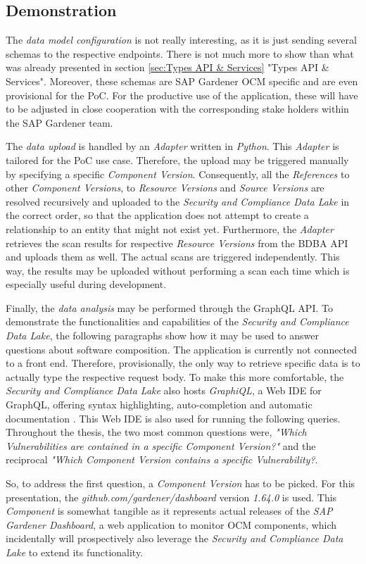 \subsection{Demonstration}
The \emph{data model configuration} is not really interesting, as it is just sending several schemas to the respective endpoints. There is not much more to show than what was already presented in section \ref{sec:Types API & Services} "Types API \& Services". Moreover, these schemas are SAP Gardener OCM specific and are even provisional for the PoC. For the productive use of the application, these will have to be adjusted in close cooperation with the corresponding stake holders within the SAP Gardener team.\par
The \emph{data upload} is handled by an \emph{Adapter} written in \emph{Python}. This \emph{Adapter} is tailored for the PoC use case. Therefore, the upload may be triggered manually by specifying a specific \emph{Component Version}. Consequently, all the \emph{References} to other \emph{Component Versions}, to \emph{Resource Versions} and  \emph{Source Versions} are resolved recursively and uploaded to the \emph{Security and Compliance Data Lake} in the correct order, so that the application does not attempt to create a relationship to an entity that might not exist yet. Furthermore, the \emph{Adapter} retrieves the scan results for respective \emph{Resource Versions} from the BDBA API and uploads them as well. The actual scans are triggered independently. This way, the results may be uploaded without performing a scan each time which is especially useful during development.\par
Finally, the \emph{data analysis} may be performed through the GraphQL API. To demonstrate the functionalities and capabilities of the \emph{Security and Compliance Data Lake}, the following paragraphs show how it may be used to answer questions about software composition. The application is currently not connected to a front end. Therefore, provisionally, the only way to retrieve specific data is to actually type the respective request body. To make this more comfortable, the \emph{Security and Compliance Data Lake} also hosts \emph{GraphiQL}, a Web IDE for GraphQL, offering syntax highlighting, auto-completion and automatic documentation \cite{graphiql}. This Web IDE is also used for running the following queries.\\

Throughout the thesis, the two most common questions were, \emph{"Which Vulnerabilities are contained in a specific Component Version?"} and the reciprocal \emph{"Which Component Version contains a specific Vulnerability?}.\par
So, to address the first question, a \emph{Component Version} has to be picked. For this presentation, the \emph{github.com/gardener/dashboard} version \emph{1.64.0} is used. This \emph{Component} is somewhat tangible as it represents actual releases of the \emph{SAP Gardener Dashboard}, a web application to monitor OCM components, which incidentally will prospectively also leverage the \emph{Security and Compliance Data Lake} to extend its functionality.

